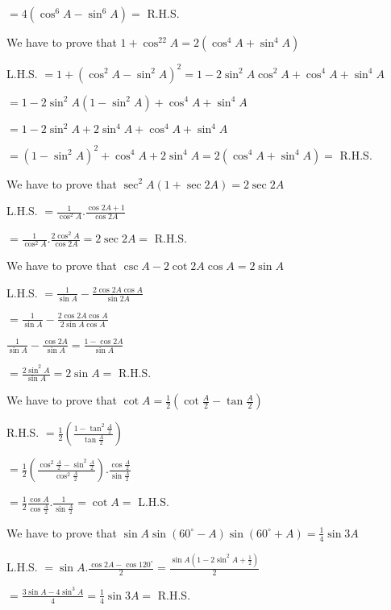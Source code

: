   $= 4(\cos^6A - \sin^6A) =$ R.H.S.

\item We have to prove that $1 + \cos^22A = 2(\cos^4A + \sin^4A)$

  L.H.S. $= 1 + (\cos^2A - \sin^2A)^2 = 1 - 2\sin^2A\cos^2A + \cos^4A + \sin^4A$

  $= 1 - 2\sin^2A(1 - \sin^2A) + \cos^4A + \sin^4A$

  $= 1 - 2\sin^2A + 2\sin^4A + \cos^4A + \sin^4A$

  $= (1 - \sin^2A)^2 + \cos^4A + 2\sin^4A = 2(\cos^4A + \sin^4A) =$ R.H.S.

\item We have to prove that $\sec^2A(1 + \sec2A) = 2\sec2A$

  L.H.S. $= \frac{1}{\cos^2A}.\frac{\cos2A + 1}{\cos 2A}$

  $= \frac{1}{\cos^2A}.\frac{2\cos^2A}{\cos 2A} = 2\sec2A =$ R.H.S.

\item We have to prove that $\csc A - 2\cot 2A\cos A = 2\sin A$

  L.H.S. $= \frac{1}{\sin A} - \frac{2\cos 2A\cos A}{\sin 2A}$

  $= \frac{1}{\sin A} - \frac{2\cos 2A\cos A}{2\sin A\cos A}$

  $\frac{1}{\sin A} - \frac{\cos 2A}{\sin A} = \frac{1 - \cos 2A}{\sin A}$

  $= \frac{2\sin^2A}{\sin A} = 2\sin A =$ R.H.S.

\item We have to prove that $\cot A = \frac{1}{2}\left(\cot\frac{A}{2} - \tan\frac{A}{2}\right)$

  R.H.S. $= \frac{1}{2}\left(\frac{1 - \tan^2\frac{A}{2}}{\tan\frac{A}{2}}\right)$

  $= \frac{1}{2}\left(\frac{\cos^2\frac{A}{2} - \sin^2\frac{A}{2}}{\cos^2\frac{A}{2}}\right).\frac{\cos\frac{A}{2}}{\sin
    \frac{A}{2}}$

  $= \frac{1}{2}\frac{\cos A}{\cos\frac{A}{2}}.\frac{1}{\sin\frac{A}{2}} = \cot A =$ L.H.S.

\item We have to prove that $\sin A\sin(60^\circ - A)\sin(60^\circ + A) = \frac{1}{4}\sin 3A$

  L.H.S. $=\sin A.\frac{\cos 2A - \cos 120^\circ}{2} = \frac{\sin A\left(1 - 2\sin^2A + \frac{1}{2}\right)}{2}$

  $= \frac{3\sin A - 4\sin^3A}{4} = \frac{1}{4}\sin 3A =$ R.H.S.

